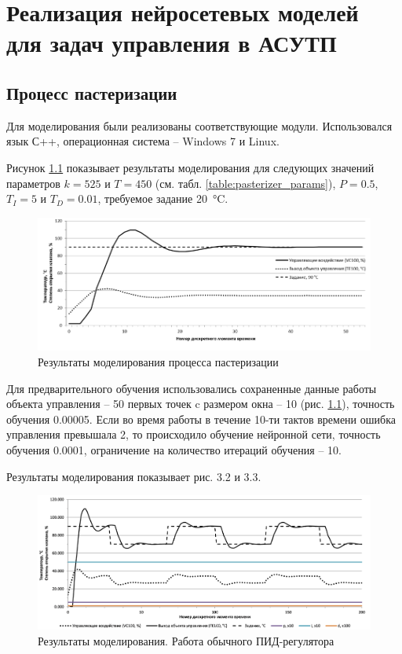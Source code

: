 \chapter{Реализация нейросетевых моделей для задач управления в АСУТП}

\section{Процесс пастеризации}

Для моделирования были реализованы соответствующие модули. Использовался язык С++, операционная система – Windows 7 и Linux.

Рисунок \ref{fig:Pasteurization_modeling_results} показывает результаты моделирования для следующих значений параметров $k = 525$ и $T = 450$ (см. табл. \ref{table:pasterizer_params}), $P = 0.5$, $T_I = 5$ и $T_D = 0.01$, требуемое задание \SI{20}{\celsius}.

\begin{figure}[H]
    \centering
    \includegraphics[width=\textwidth]{images/chapter_3/Pasteurization_modeling_results.png}
    \caption{Результаты моделирования процесса пастеризации}
    \label{fig:Pasteurization_modeling_results}
\end{figure}

Для предварительного обучения использовались сохраненные данные работы объекта управления – 50 первых точек c размером окна – 10 (рис. \ref{fig:Pasteurization_modeling_results}), точность обучения 0.00005. Если во время работы в течение 10-ти тактов времени ошибка управления превышала 2, то происходило обучение нейронной сети, точность обучения 0.0001, ограничение на количество итераций обучения – 10.

Результаты моделирования показывает рис. 3.2 и 3.3.

\begin{figure}[H]
    \centering
    \includegraphics[width=\textwidth]{images/chapter_3/Pasteurization_modeling_results_with_typical_PID.png}
    \caption{Результаты моделирования. Работа обычного ПИД-регулятора}
    \label{fig:Pasteurization_modeling_results_with_typical_PID}
\end{figure}


